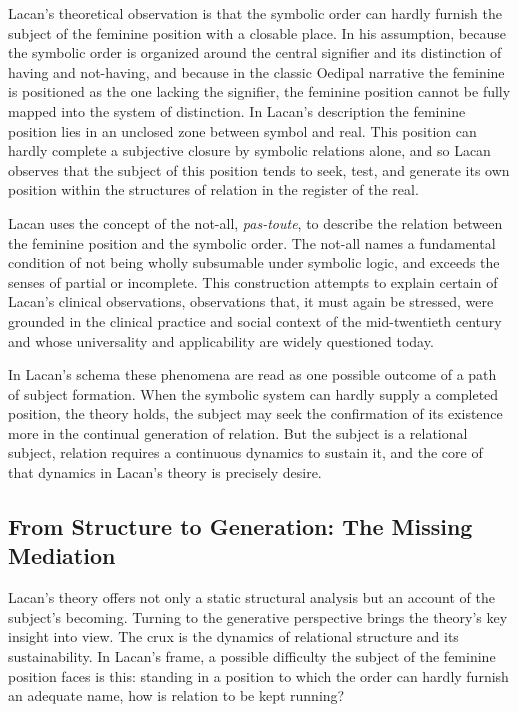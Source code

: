 Lacan's theoretical observation is that the symbolic order can hardly furnish the subject of the feminine position with a closable place. In his assumption, because the symbolic order is organized around the central signifier and its distinction of having and not-having, and because in the classic Oedipal narrative the feminine is positioned as the one lacking the signifier, the feminine position cannot be fully mapped into the system of distinction. In Lacan's description the feminine position lies in an unclosed zone between symbol and real. This position can hardly complete a subjective closure by symbolic relations alone, and so Lacan observes that the subject of this position tends to seek, test, and generate its own position within the structures of relation in the register of the real.

Lacan uses the concept of the not-all, \textit{pas-toute}, to describe the relation between the feminine position and the symbolic order. The not-all names a fundamental condition of not being wholly subsumable under symbolic logic, and exceeds the senses of partial or incomplete. This construction attempts to explain certain of Lacan's clinical observations, observations that, it must again be stressed, were grounded in the clinical practice and social context of the mid-twentieth century and whose universality and applicability are widely questioned today.

In Lacan's schema these phenomena are read as one possible outcome of a path of subject formation. When the symbolic system can hardly supply a completed position, the theory holds, the subject may seek the confirmation of its existence more in the continual generation of relation. But the subject is a relational subject, relation requires a continuous dynamics to sustain it, and the core of that dynamics in Lacan's theory is precisely desire.

\subsection{From Structure to Generation: The Missing Mediation}

Lacan's theory offers not only a static structural analysis but an account of the subject's becoming. Turning to the generative perspective brings the theory's key insight into view. The crux is the dynamics of relational structure and its sustainability. In Lacan's frame, a possible difficulty the subject of the feminine position faces is this: standing in a position to which the order can hardly furnish an adequate name, how is relation to be kept running?

